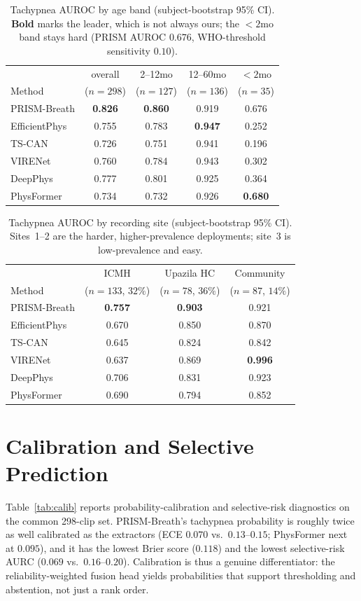 \begin{table}[!t]
\caption{Tachypnea AUROC by age band (subject-bootstrap 95\% CI). \textbf{Bold} marks the leader, which
is not always ours; the $<2$mo band stays hard (PRISM AUROC $0.676$, WHO-threshold sensitivity $0.10$).}
\label{tab:agesubgroup}\centering\small
\begin{tabular}{@{}lcccc@{}}\toprule
 & overall & 2--12mo & 12--60mo & $<2$mo\\
Method & ($n{=}298$) & ($n{=}127$) & ($n{=}136$) & ($n{=}35$)\\\midrule
PRISM-Breath  & \textbf{0.826} & \textbf{0.860} & 0.919 & 0.676\\
EfficientPhys & 0.755 & 0.783 & \textbf{0.947} & 0.252\\
TS-CAN        & 0.726 & 0.751 & 0.941 & 0.196\\
VIRENet       & 0.760 & 0.784 & 0.943 & 0.302\\
DeepPhys      & 0.777 & 0.801 & 0.925 & 0.364\\
PhysFormer    & 0.734 & 0.732 & 0.926 & \textbf{0.680}\\\bottomrule
\end{tabular}
\end{table}

\begin{table}[!t]
\caption{Tachypnea AUROC by recording site (subject-bootstrap 95\% CI). Sites~1--2 are the harder,
higher-prevalence deployments; site~3 is low-prevalence and easy.}
\label{tab:sitesubgroup}\centering\small
\setlength{\tabcolsep}{4pt}
\begin{tabular}{@{}lccc@{}}\toprule
 & ICMH & Upazila HC & Community\\
Method & ($n{=}133$, $32\%$) & ($n{=}78$, $36\%$) & ($n{=}87$, $14\%$)\\\midrule
PRISM-Breath  & \textbf{0.757} & \textbf{0.903} & 0.921\\
EfficientPhys & 0.670 & 0.850 & 0.870\\
TS-CAN        & 0.645 & 0.824 & 0.842\\
VIRENet       & 0.637 & 0.869 & \textbf{0.996}\\
DeepPhys      & 0.706 & 0.831 & 0.923\\
PhysFormer    & 0.690 & 0.794 & 0.852\\\bottomrule
\end{tabular}
\end{table}

\section{Calibration and Selective Prediction}
\label{app:calib}
Table~\ref{tab:calib} reports probability-calibration and selective-risk diagnostics on the common
298-clip set. PRISM-Breath's tachypnea probability is roughly twice as well calibrated as the extractors
(ECE $0.070$ vs.\ $0.13$--$0.15$; PhysFormer next at $0.095$), and it has the lowest Brier score ($0.118$)
and the lowest selective-risk AURC ($0.069$ vs.\ $0.16$--$0.20$). Calibration is thus a genuine
differentiator: the reliability-weighted fusion head yields probabilities that support thresholding and
abstention, not just a rank order.

